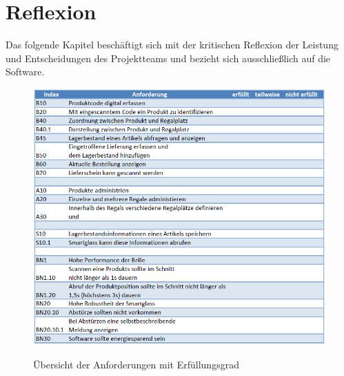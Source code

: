 %
%
%
%
%
%

\chapter{Reflexion}
Das folgende Kapitel beschäftigt sich mit der kritischen Reflexion der Leistung und Entscheidungen des Projektteams und bezieht sich ausschließlich auf die Software.\\

\begin{figure}[H]
	\centering
	{\includegraphics[scale=0.73]{Bilder/Abbildungen/anforderungen_zusammenfassung_bewertung.png}}
	\caption{Übersicht der Anforderungen mit Erfüllungsgrad}
	\label{fig:anforderungen_erfuellt}
\end{figure}

